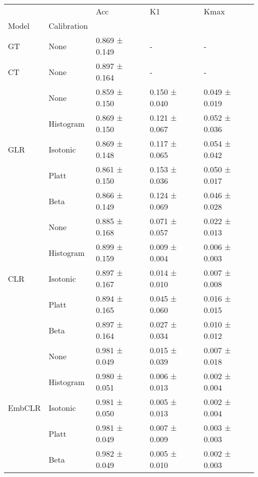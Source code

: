\begin{tabular}{lllll}
\toprule
 &  & Acc & K1 & Kmax \\
Model & Calibration &  &  &  \\
\midrule
GT & None & 0.869 ± 0.149 & - & - \\
\cline{1-5}
CT & None & 0.897 ± 0.164 & - & - \\
\cline{1-5}
\multirow[t]{5}{*}{GLR} & None & 0.859 ± 0.150 & 0.150 ± 0.040 & 0.049 ± 0.019 \\
 & Histogram & 0.869 ± 0.150 & 0.121 ± 0.067 & 0.052 ± 0.036 \\
 & Isotonic & 0.869 ± 0.148 & 0.117 ± 0.065 & 0.054 ± 0.042 \\
 & Platt & 0.861 ± 0.150 & 0.153 ± 0.036 & 0.050 ± 0.017 \\
 & Beta & 0.866 ± 0.149 & 0.124 ± 0.069 & 0.046 ± 0.028 \\
\cline{1-5}
\multirow[t]{5}{*}{CLR} & None & 0.885 ± 0.168 & 0.071 ± 0.057 & 0.022 ± 0.013 \\
 & Histogram & 0.899 ± 0.159 & 0.009 ± 0.004 & 0.006 ± 0.003 \\
 & Isotonic & 0.897 ± 0.167 & 0.014 ± 0.010 & 0.007 ± 0.008 \\
 & Platt & 0.894 ± 0.165 & 0.045 ± 0.060 & 0.016 ± 0.015 \\
 & Beta & 0.897 ± 0.164 & 0.027 ± 0.034 & 0.010 ± 0.012 \\
\cline{1-5}
\multirow[t]{5}{*}{EmbCLR} & None & 0.981 ± 0.049 & 0.015 ± 0.039 & 0.007 ± 0.018 \\
 & Histogram & 0.980 ± 0.051 & 0.006 ± 0.013 & 0.002 ± 0.004 \\
 & Isotonic & 0.981 ± 0.050 & 0.005 ± 0.013 & 0.002 ± 0.004 \\
 & Platt & 0.981 ± 0.049 & 0.007 ± 0.009 & 0.003 ± 0.003 \\
 & Beta & 0.982 ± 0.049 & 0.005 ± 0.010 & 0.002 ± 0.003 \\
\cline{1-5}
\bottomrule
\end{tabular}
